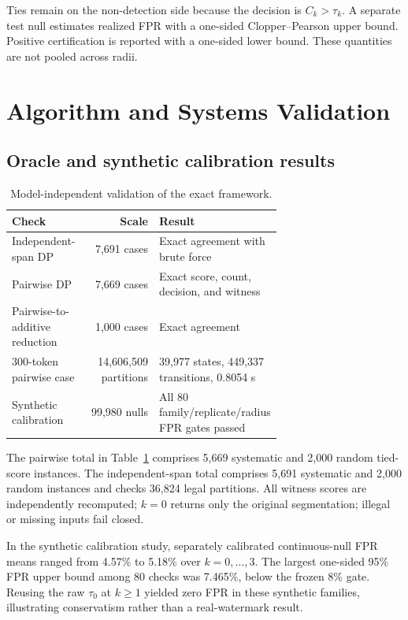 \documentclass[10pt]{article}
\begin{document}
Ties remain on the non-detection side because the decision is
$C_k>\tau_k$. A separate test null estimates realized FPR with a one-sided
Clopper--Pearson upper bound. Positive certification is reported with a
one-sided lower bound. These quantities are not pooled across radii.

\section{Algorithm and Systems Validation}

\subsection{Oracle and synthetic calibration results}

\begin{table}[t]
\caption{Model-independent validation of the exact framework.}
\label{tab:algorithm}
\centering
\small
\begin{tabular}{p{0.25\linewidth}rp{0.43\linewidth}}
\toprule
Check & Scale & Result \\
\midrule
Independent-span DP & 7,691 cases & Exact agreement with brute force \\
Pairwise DP & 7,669 cases & Exact score, count, decision, and witness \\
Pairwise-to-additive reduction & 1,000 cases & Exact agreement \\
300-token pairwise case & 14,606,509 partitions &
39,977 states, 449,337 transitions, 0.8054 s \\
Synthetic calibration & 99,980 nulls &
All 80 family/replicate/radius FPR gates passed \\
\bottomrule
\end{tabular}
\end{table}

The pairwise total in Table~\ref{tab:algorithm} comprises 5,669 systematic
and 2,000 random tied-score instances. The independent-span total comprises
5,691 systematic and 2,000 random instances and checks 36,824 legal
partitions. All witness scores are independently recomputed; $k=0$ returns
only the original segmentation; illegal or missing inputs fail closed.

In the synthetic calibration study, separately calibrated continuous-null
FPR means ranged from 4.57\% to 5.18\% over $k=0,\ldots,3$. The largest
one-sided 95\% FPR upper bound among 80 checks was 7.465\%, below the frozen
8\% gate. Reusing the raw $\tau_0$ at $k\geq1$ yielded zero FPR in these
synthetic families, illustrating conservatism rather than a real-watermark
result.
\end{document}

